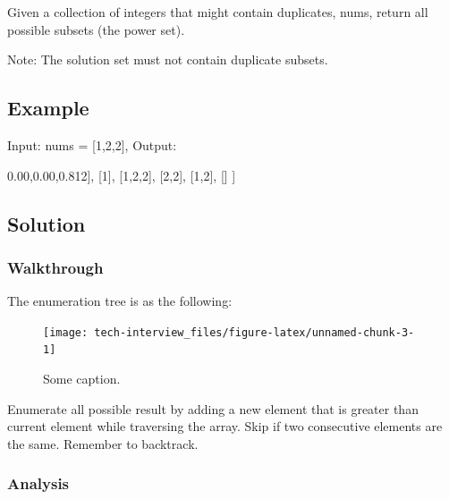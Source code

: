 \documentclass[]{book}
\newenvironment{Shaded}{\begin{snugshade}}{\end{snugshade}}
\newcommand{\DecValTok}[1]{\textcolor[rgb]{0.00,0.00,0.81}{#1}}
\newcommand{\NormalTok}[1]{#1}
\begin{document}
Given a collection of integers that might contain duplicates, nums, return all possible subsets (the power set).

Note: The solution set must not contain duplicate subsets.

\hypertarget{example-16}{%
\subsection{Example}\label{example-16}}

Input: nums = {[}1,2,2{]}, Output:

\begin{Shaded}
\begin{Highlighting}[]
\NormalTok{[}
\NormalTok{    [}\DecValTok{2}\NormalTok{],}
\NormalTok{    [}\DecValTok{1}\NormalTok{],}
\NormalTok{    [}\DecValTok{1}\NormalTok{,}\DecValTok{2}\NormalTok{,}\DecValTok{2}\NormalTok{],}
\NormalTok{    [}\DecValTok{2}\NormalTok{,}\DecValTok{2}\NormalTok{],}
\NormalTok{    [}\DecValTok{1}\NormalTok{,}\DecValTok{2}\NormalTok{],}
\NormalTok{    []}
\NormalTok{]}
\end{Highlighting}
\end{Shaded}

\hypertarget{solution-12}{%
\subsection{Solution}\label{solution-12}}

\hypertarget{walkthrough-16}{%
\subsubsection{Walkthrough}\label{walkthrough-16}}

The enumeration tree is as the following:

\begin{figure}
\texttt{[image: tech-interview\_files/figure-latex/unnamed-chunk-3-1]} \caption{Some caption.}\label{fig:unnamed-chunk-3}
\end{figure}

Enumerate all possible result by adding a new element that is greater than current element while traversing the array.
Skip if two consecutive elements are the same. Remember to backtrack.

\hypertarget{analysis-18}{%
\subsubsection{Analysis}\label{analysis-18}}
\end{document}
